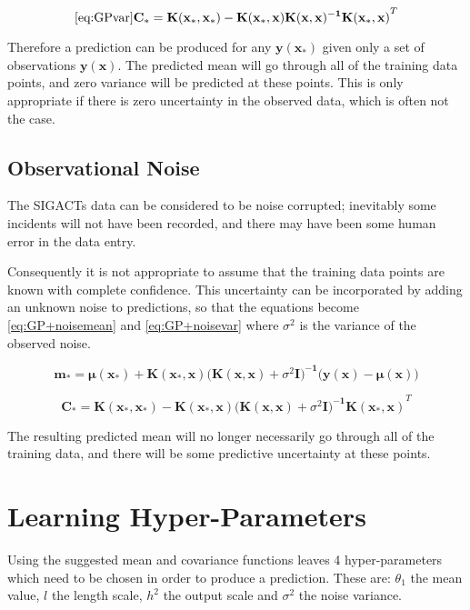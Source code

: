 \documentclass[a4paper,11pt]{report}
\begin{document}
\begin{equation} \ref{eq:GPvar}
\mathbf{ C_* = K(x_*,x_*)-K(x_*,x) K(x,x)^{-1} K(x_*,x)}^{T}
\end{equation}

\doublespacing

Therefore a prediction can be produced for any \(\mathbf{y(x_*)}\) given only a set of observations \(\mathbf{y(x)}\). The predicted mean will go through all of the training data points, and zero variance will be predicted at these points. This is only appropriate if there is zero uncertainty in the observed data, which is often not the case.

\subsection{Observational Noise}

The SIGACTs data can be considered to be noise corrupted; inevitably some incidents will not have been recorded, and there may have been some human error in the data entry. 

Consequently it is not appropriate to assume that the training data points are known with complete confidence. This uncertainty can be incorporated by adding an unknown noise to predictions, so that the equations become \ref{eq:GP+noisemean} and \ref{eq:GP+noisevar} where \( \sigma^2 \) is the variance of the observed noise.

\singlespacing


\begin{equation} \label{eq:GP+noisemean}
\mathbf{m_*} = \boldsymbol{\mu} \mathbf{(x_*) + K(x_* ,x) (K(x,x)}+\sigma^2 \mathbf{I)^{-1} (y(x)} - \boldsymbol{\mu} \mathbf{(x))}
\end{equation}

\begin{equation} \label{eq:GP+noisevar}
\mathbf{ C_* = K(x_*,x_*)-K(x_*,x) (K(x,x)}+\sigma^2 \mathbf{I)^{-1} K(x_*,x)}^{T}
\end{equation}

\doublespacing

The resulting predicted mean will no longer necessarily go through all of the training data, and there will be some predictive uncertainty at these points.

\section{Learning Hyper-Parameters}
Using the suggested mean and covariance functions leaves 4 hyper-parameters which need to be chosen in order to produce a prediction. These are: \(\theta_1\) the mean value, \(l\) the length scale, \(h^2\) the output scale and \(\sigma^2\) the noise variance. 
\end{document}
